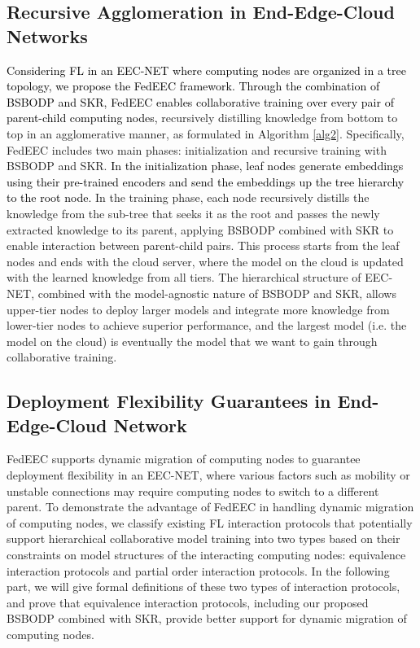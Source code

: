 \documentclass[10pt,journal]{IEEEtran}
\begin{document}
\subsection{Recursive Agglomeration in End-Edge-Cloud Networks}
\textcolor{black}{Considering FL in an EEC-NET where computing nodes are organized in a tree topology, we propose the FedEEC framework. Through the combination of BSBODP and SKR, FedEEC enables collaborative training over every pair of parent-child computing nodes,} recursively distilling knowledge from bottom to top in an agglomerative manner, as formulated in Algorithm \ref{alg2}. Specifically, FedEEC includes two main phases: initialization and recursive training with BSBODP and SKR. 
\textcolor{black}{In the initialization phase, leaf nodes generate embeddings using their pre-trained encoders and send the embeddings up the tree hierarchy to the root node.} In the training phase, each node recursively distills the knowledge from the sub-tree that seeks it as the root and passes the newly extracted knowledge to its parent, applying BSBODP combined with SKR to enable interaction between parent-child pairs.
This process starts from the leaf nodes and ends with the cloud server, where the model on the cloud is updated with the learned knowledge from all tiers. The hierarchical structure of EEC-NET, combined with the model-agnostic nature of BSBODP and SKR, allows upper-tier nodes to deploy larger models and integrate more knowledge from lower-tier nodes to achieve superior performance, and the largest model (i.e. the model on the cloud) is eventually the model that we want to gain through collaborative training.







\subsection{Deployment Flexibility Guarantees in End-Edge-Cloud Network}
FedEEC supports dynamic migration of computing nodes to guarantee deployment flexibility in an EEC-NET, where various factors such as mobility or unstable connections may require computing nodes to switch to a different parent. 
To demonstrate the advantage of FedEEC in handling dynamic migration of computing nodes, we classify existing FL interaction protocols that potentially support hierarchical collaborative model training into two types based on their constraints on model structures of the interacting computing nodes: equivalence interaction protocols and partial order interaction protocols. 
In the following part, we will give formal definitions of these two types of interaction protocols, and prove that equivalence interaction protocols, including our proposed BSBODP combined with SKR, provide better support for dynamic migration of computing nodes.
\end{document}
